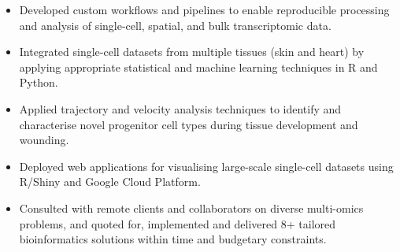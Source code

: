 \documentclass[10pt,a4paper,ragged2e,withhyper]{altacv2}
\begin{document}
\makecvheader
\medskip\medskip

\emergencystretch=10pt



\begin{paracol}{2}


\begin{itemize}
\item Developed custom workflows and pipelines to enable reproducible processing and analysis of single-cell, spatial, and bulk transcriptomic data.
\item Integrated single-cell datasets from multiple tissues (skin and heart) by applying appropriate statistical and machine learning techniques in R and Python.
\item Applied trajectory and velocity analysis techniques to identify and characterise novel progenitor cell types during tissue development and wounding. 
\item Deployed web applications for visualising large-scale single-cell datasets using R/Shiny and Google Cloud Platform.
\item Consulted with remote clients and collaborators on diverse multi-omics problems, and quoted for, implemented and delivered 8+ tailored bioinformatics solutions within time and budgetary constraints.
\end{itemize}



\end{paracol}
\end{document}
